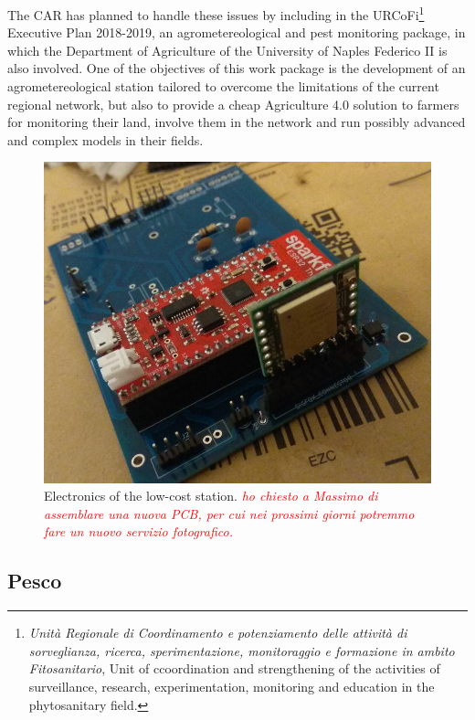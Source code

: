 \documentclass[authoryear,preprint,review,12pt]{elsarticle}
\newcommand{\note}[1]{\emph{\textcolor{red}{#1}}}
\begin{document}
The CAR has planned to handle these issues by including in the URCoFi\footnote{\emph{Unità Regionale di Coordinamento e potenziamento delle attività di sorveglianza, ricerca, sperimentazione, monitoraggio e formazione in ambito Fitosanitario}, Unit of ccoordination and strengthening of the activities of surveillance, research, experimentation, monitoring and education in the phytosanitary field.} Executive Plan 2018-2019, an agrometereological and pest monitoring package, in which the Department of Agriculture of the University of Naples Federico II is also involved. 
One of the objectives of this work package is the development of an agrometereological station tailored to overcome the limitations of the current regional network, but also to provide a cheap Agriculture 4.0 solution to farmers for monitoring their land, involve them in the network and run possibly advanced and complex models in their fields.

\begin{figure}
    \centering
    \includegraphics[scale=.20]{lcn_board.jpg} %
    \caption{Electronics of the low-cost station. \note{ho chiesto a Massimo di assemblare una nuova PCB, per cui nei prossimi giorni potremmo fare un nuovo servizio fotografico.}}
    \label{fig:station}
\end{figure}

\subsection{Pesco}
\end{document}
